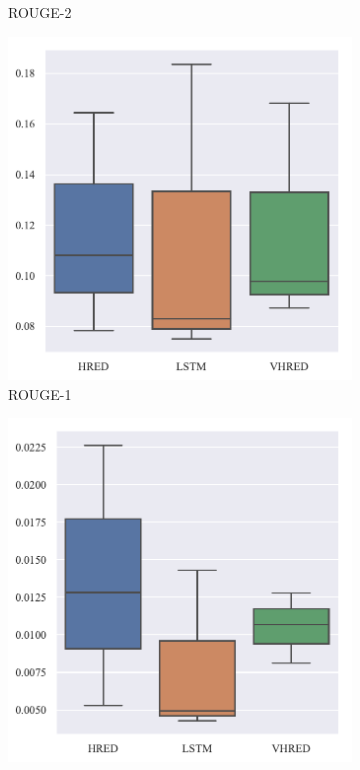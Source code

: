 \begin{figure}[H]
\begin{subfigure}{0.23\linewidth}
        \caption{ROUGE-2}
    \end{subfigure}%
    \begin{subfigure}{0.23\linewidth}
        \centering
        \includegraphics[width=\linewidth]{figure/boxplot/model/rouge_1/plot.pdf}
        \caption{ROUGE-1}
    \end{subfigure}%
    \begin{subfigure}{0.23\linewidth}
        \centering
        \includegraphics[width=\linewidth]{figure/boxplot/model/rouge_2/plot.pdf}

\end{subfigure}
\end{figure}
